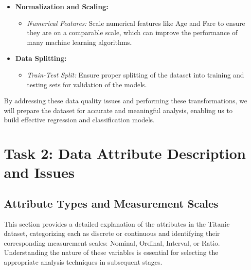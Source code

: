 \documentclass[twoside,11pt]{article}
\begin{document}
\begin{itemize}
\begin{itemize}
    \end{itemize}
    \item \textbf{Normalization and Scaling:}
    \begin{itemize}
        \item \textit{Numerical Features:} Scale numerical features like Age and Fare to ensure they are on a comparable scale, which can improve the performance of many machine learning algorithms.
    \end{itemize}
    \item \textbf{Data Splitting:}
    \begin{itemize}
        \item \textit{Train-Test Split:} Ensure proper splitting of the dataset into training and testing sets for validation of the models.
    \end{itemize}
\end{itemize}

By addressing these data quality issues and performing these transformations, we will prepare the dataset for accurate and meaningful analysis, enabling us to build effective regression and classification models.


\section*{Task 2: Data Attribute Description and Issues}

\subsection{Attribute Types and Measurement Scales}
This section provides a detailed explanation of the attributes in the Titanic dataset, categorizing each as discrete or continuous and identifying their corresponding measurement scales: Nominal, Ordinal, Interval, or Ratio. Understanding the nature of these variables is essential for selecting the appropriate analysis techniques in subsequent stages.
\end{document}
